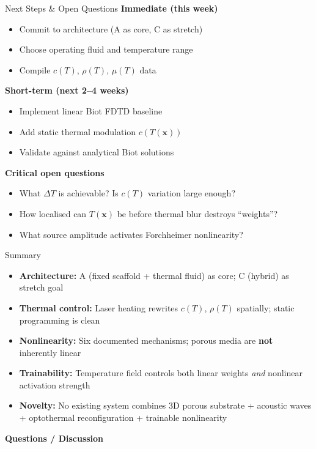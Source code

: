 \documentclass[aspectratio=169,11pt]{beamer}
\begin{document}
\begin{frame}{Next Steps \& Open Questions}
  \textbf{Immediate (this week)}
  \begin{itemize}
    \item Commit to architecture (A as core, C as stretch)
    \item Choose operating fluid and temperature range
    \item Compile $c(T)$, $\rho(T)$, $\mu(T)$ data
  \end{itemize}

  \vspace{0.15cm}
  \textbf{Short-term (next 2--4 weeks)}
  \begin{itemize}
    \item Implement linear Biot FDTD baseline
    \item Add static thermal modulation $c(T(\mathbf{x}))$
    \item Validate against analytical Biot solutions
  \end{itemize}

  \vspace{0.15cm}
  \textbf{Critical open questions}
  \begin{itemize}
    \item What $\Delta T$ is achievable? Is $c(T)$ variation large enough?
    \item How localised can $T(\mathbf{x})$ be before thermal blur destroys ``weights''?
    \item What source amplitude activates Forchheimer nonlinearity?
  \end{itemize}
\end{frame}

\begin{frame}{Summary}
  \begin{itemize}
    \item \textbf{Architecture:} A (fixed scaffold + thermal fluid) as core; C (hybrid) as stretch goal
    \item \textbf{Thermal control:} Laser heating rewrites $c(T)$, $\rho(T)$ spatially; static programming is clean
    \item \textbf{Nonlinearity:} Six documented mechanisms; porous media are \textbf{not} inherently linear
    \item \textbf{Trainability:} Temperature field controls both linear weights \textit{and} nonlinear activation strength
    \item \textbf{Novelty:} No existing system combines 3D porous substrate + acoustic waves + optothermal reconfiguration + trainable nonlinearity
  \end{itemize}

  \vspace{0.4cm}
  \begin{center}
    \Large\textbf{\textcolor{gdpPurple}{Questions / Discussion}}
  \end{center}
\end{frame}
\end{document}
